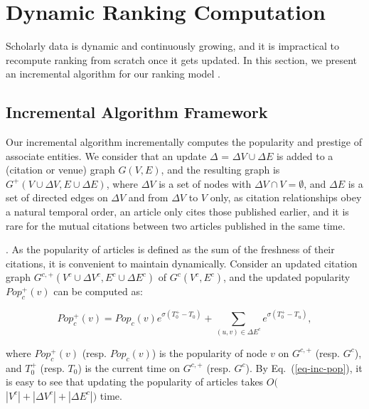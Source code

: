 \section{Dynamic Ranking Computation}
\label{sec-incAlg}

Scholarly data is dynamic and continuously growing, and it is impractical to recompute ranking from scratch once it gets updated. In this section, we present an incremental algorithm for our ranking model \ensemblerank.


\subsection{Incremental Algorithm Framework}
\label{subsec-inc-alg}




Our incremental algorithm \incensemble incrementally computes the popularity and prestige of associate entities.
We consider that an update $\Delta$ = $\Delta V\cup\Delta E$ is added to a (citation or venue) graph $G(V, E)$,
and the resulting graph is $G^+(V\cup\Delta V, E\cup\Delta E)$, where
$\Delta V$ is a set of nodes with $\Delta V\cap V = \emptyset$, and $\Delta E$ is a set of directed edges on $\Delta V$ and from $\Delta V$ to $V$ only, as citation relationships obey a natural temporal order, \ie an article only cites those published earlier, and it is rare for the mutual citations between two articles published in the same time.


.
As the popularity of articles is defined as the sum of the freshness of their citations, it is convenient to maintain dynamically. Consider an updated citation graph $G^{c,+}(V^c\cup\Delta V^c, E^c\cup\Delta E^c)$ of $G^c(V^c, E^c)$, and the updated popularity $Pop_{c}^+(v)$ can be computed as:

\vspace{-1ex}
\begin{small}
\begin{equation}\label{eq-inc-pop}
Pop_c^+(v) = Pop_c(v) {e^{\sigma (T^+_0-T_0)}} + \sum_{(u,v)\in \Delta E^c} {e^{\sigma (T^+_0-T_u)}},
\end{equation}
\end{small}
%
\noindent where $Pop^+_c(v)$ (resp. $Pop_c(v)$) is the popularity of node $v$ on $G^{c,+}$ (resp. $G^c$), and
$T^+_0$ (resp. $T_0$) is the current time on $G^{c,+}$ (resp. $G^c$).
%
By Eq.~(\ref{eq-inc-pop}), it is easy to see that updating the popularity of articles takes $O($ $|V^c|+|\Delta V^c|+|\Delta E^c|)$ time.

